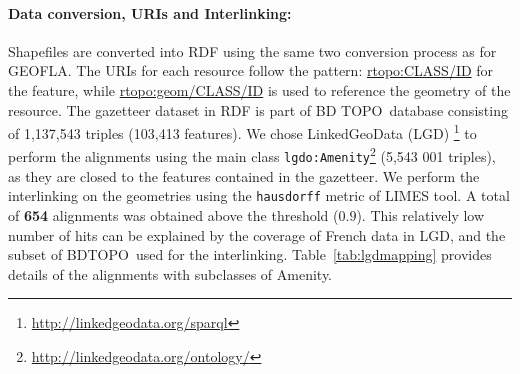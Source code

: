 \paragraph{Data conversion, URIs and Interlinking:}
Shapefiles are converted into RDF using the same two conversion process as for GEOFLA\circledR. The URIs for each resource follow the pattern: \url{rtopo:CLASS/ID} for the feature, while  \url{rtopo:geom/CLASS/ID} is used to reference the geometry of the resource.
The gazetteer dataset in RDF is part of BD TOPO\circledR ~database consisting of  1,137,543 triples (103,413 features). We chose LinkedGeoData (LGD)
\footnote{\url{http://linkedgeodata.org/sparql}} to perform the alignments using the main class \texttt{lgdo:Amenity}\footnote{\url{http://linkedgeodata.org/ontology/}} (5,543 001 triples), as they are closed to the features contained in the gazetteer. We perform the interlinking on the geometries using the \texttt{hausdorff} metric of LIMES tool. A total of \textbf{654} alignments was obtained above the threshold ($0.9$). This relatively low number of hits can be explained by the coverage of French data in LGD, and the subset of BDTOPO\circledR  ~used for the interlinking. Table~\ref{tab:lgdmapping} provides details of the alignments with subclasses of Amenity.

\begin{table}[!htbp]
\end{table}


